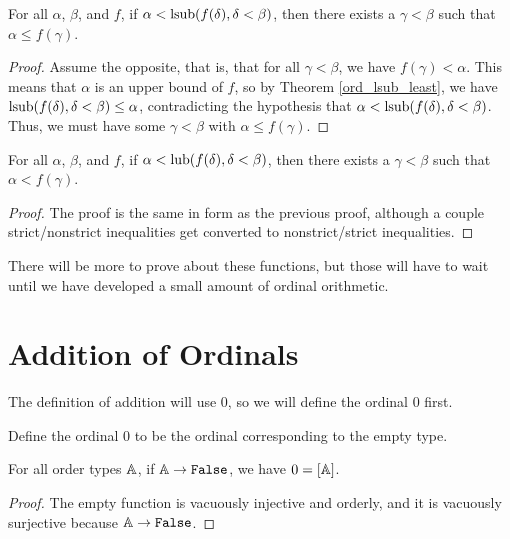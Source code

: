 \documentclass[../../math.tex]{subfiles}
\begin{document}
\begin{theorem} \label{ord_lsub_in}
    For all $\alpha$, $\beta$, and $f$, if $\alpha < \operatorname{lsub}(f(\delta), \delta <
    \beta)$, then there exists a $\gamma < \beta$ such that $\alpha \leq
    f(\gamma)$.
\end{theorem}
\begin{proof}
    Assume the opposite, that is, that for all $\gamma < \beta$, we have
    $f(\gamma) < \alpha$.  This means that $\alpha$ is an upper bound of $f$, so
    by Theorem \ref{ord_lsub_least}, we have $\operatorname{lsub}(f(\delta), \delta < \beta)
    \leq \alpha$, contradicting the hypothesis that $\alpha < \operatorname{lsub}(f(\delta),
    \delta < \beta)$.  Thus, we must have some $\gamma < \beta$ with $\alpha
    \leq f(\gamma)$.
\end{proof}

\begin{theorem} \label{ord_lub_in}
    For all $\alpha$, $\beta$, and $f$, if $\alpha < \operatorname{lub}(f(\delta), \delta <
    \beta)$, then there exists a $\gamma < \beta$ such that $\alpha <
    f(\gamma)$.
\end{theorem}
\begin{proof}
    The proof is the same in form as the previous proof, although a couple
    strict/nonstrict inequalities get converted to nonstrict/strict
    inequalities.
\end{proof}

There will be more to prove about these functions, but those will have to wait
until we have developed a small amount of ordinal orithmetic.

\section{Addition of Ordinals}

The definition of addition will use $0$, so we will define the ordinal $0$
first.

\begin{instance}
    Define the ordinal $0$ to be the ordinal corresponding to the empty type.
\end{instance}

\begin{theorem} \label{ord_false_0}
    For all order types $\mathbb{A}$, if $\A \to \False$, we have $0 = [\mathbb{A}]$.
\end{theorem}
\begin{proof}
    The empty function is vacuously injective and orderly, and it is vacuously
    surjective because $\A \to \False$.
\end{proof}
\end{document}
